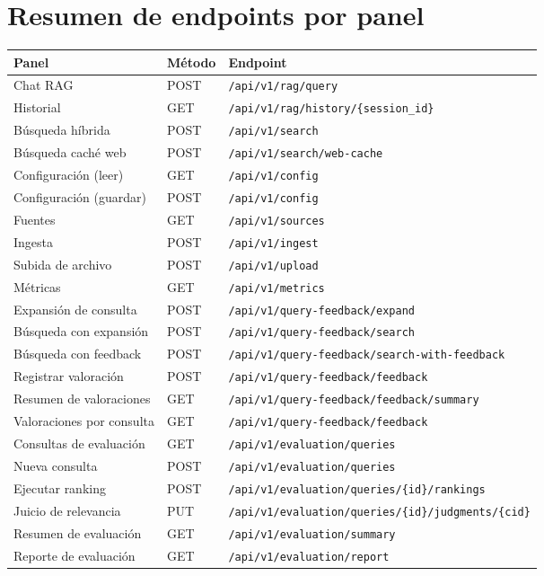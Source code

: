 \documentclass[11pt]{article}
\begin{document}
\section{Resumen de endpoints por panel}

\begin{center}
\begin{tabular}{llp{6cm}}
\toprule
\textbf{Panel} & \textbf{Método} & \textbf{Endpoint} \\
\midrule
Chat RAG                  & POST & \texttt{/api/v1/rag/query} \\
Historial                 & GET  & \texttt{/api/v1/rag/history/\{session\_id\}} \\
Búsqueda híbrida          & POST & \texttt{/api/v1/search} \\
Búsqueda caché web        & POST & \texttt{/api/v1/search/web-cache} \\
Configuración (leer)      & GET  & \texttt{/api/v1/config} \\
Configuración (guardar)   & POST & \texttt{/api/v1/config} \\
Fuentes                   & GET  & \texttt{/api/v1/sources} \\
Ingesta                   & POST & \texttt{/api/v1/ingest} \\
Subida de archivo         & POST & \texttt{/api/v1/upload} \\
Métricas                  & GET  & \texttt{/api/v1/metrics} \\
Expansión de consulta     & POST & \texttt{/api/v1/query-feedback/expand} \\
Búsqueda con expansión    & POST & \texttt{/api/v1/query-feedback/search} \\
Búsqueda con feedback     & POST & \texttt{/api/v1/query-feedback/search-with-feedback} \\
Registrar valoración      & POST & \texttt{/api/v1/query-feedback/feedback} \\
Resumen de valoraciones   & GET  & \texttt{/api/v1/query-feedback/feedback/summary} \\
Valoraciones por consulta & GET  & \texttt{/api/v1/query-feedback/feedback} \\
Consultas de evaluación   & GET  & \texttt{/api/v1/evaluation/queries} \\
Nueva consulta            & POST & \texttt{/api/v1/evaluation/queries} \\
Ejecutar ranking          & POST & \texttt{/api/v1/evaluation/queries/\{id\}/rankings} \\
Juicio de relevancia      & PUT  & \texttt{/api/v1/evaluation/queries/\{id\}/judgments/\{cid\}} \\
Resumen de evaluación     & GET  & \texttt{/api/v1/evaluation/summary} \\
Reporte de evaluación     & GET  & \texttt{/api/v1/evaluation/report} \\
\bottomrule
\end{tabular}
\end{center}
\end{document}
